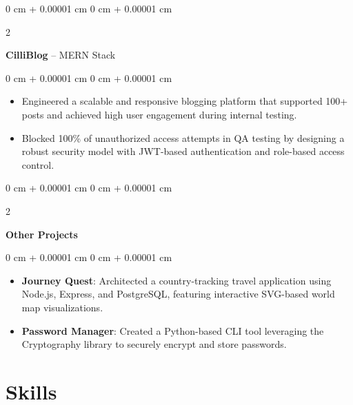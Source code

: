 \documentclass[10pt, letterpaper]{article}
\newenvironment{highlights}{
    \begin{itemize}[
        topsep=0.10 cm,
        parsep=0.10 cm,
        partopsep=0pt,
        itemsep=0pt,
        leftmargin=0 cm + 10pt
    ]
}{
    \end{itemize}
} %
\newenvironment{onecolentry}{
    \begin{adjustwidth}{
        0 cm + 0.00001 cm
    }{
        0 cm + 0.00001 cm
    }
}{
    \end{adjustwidth}
} %
\newenvironment{twocolentry}[2][]{
    \onecolentry
    \def\secondColumn{#2}
    \setcolumnwidth{\fill, 4.5 cm}
    \begin{paracol}{2}
}{
    \switchcolumn \raggedleft \secondColumn
    \end{paracol}
    \endonecolentry
} %
\begin{document}
        \vspace{0.2 cm}

        \begin{twocolentry}{
            \href{https://github.com/ritheshan/blog-app}{\faGithub}
        }
            \textbf{CilliBlog} -- MERN Stack\end{twocolentry}

        \vspace{0.10 cm}
        \begin{onecolentry}
            \begin{highlights}
                \item Engineered a scalable and responsive blogging platform that supported 100+ posts and achieved high user engagement during internal testing.
                \item Blocked 100\% of unauthorized access attempts in QA testing by designing a robust security model with JWT-based authentication and role-based access control.
            \end{highlights}
        \end{onecolentry}

        \vspace{0.2 cm}

        \begin{twocolentry}{
            \href{https://github.com/ritheshan}{\faGithub}
        }
            \textbf{Other Projects}\end{twocolentry}

        \vspace{0.10 cm}
        \begin{onecolentry}
            \begin{highlights}
                \item \textbf{Journey Quest}: Architected a country-tracking travel application using Node.js, Express, and PostgreSQL, featuring interactive SVG-based world map visualizations.
                \item \textbf{Password Manager}: Created a Python-based CLI tool leveraging the Cryptography library to securely encrypt and store passwords.
            \end{highlights}
        \end{onecolentry}

    \section{Skills}
\end{document}
